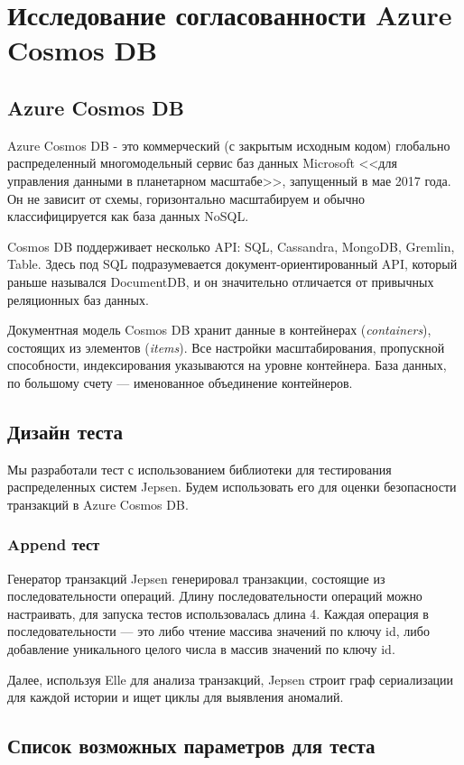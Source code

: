 \documentclass[12pt,  openany]{book}
\begin{document}
\chapter{Исследование согласованности Azure Cosmos DB}
\section{Azure Cosmos DB}
Azure Cosmos DB - это коммерческий (с закрытым исходным кодом) глобально распределенный многомодельный сервис баз данных Microsoft <<для управления данными в планетарном масштабе>>, запущенный в мае 2017 года. Он не зависит от схемы, горизонтально масштабируем и обычно классифицируется как база данных NoSQL.
\par Cosmos DB поддерживает несколько API: SQL, Cassandra, MongoDB, Gremlin, Table. Здесь под SQL подразумевается документ-ориентированный API, который раньше назывался DocumentDB, и он значительно отличается от привычных реляционных баз данных.
\par Документная модель Cosmos DB хранит данные в контейнерах (\textit{containers}), состоящих из элементов (\textit{items}). Все настройки масштабирования, пропускной способности, индексирования указываются на уровне контейнера. База данных, по большому счету --- именованное объединение контейнеров.

\section{Дизайн теста}
Мы разработали тест с использованием библиотеки для тестирования распределенных систем Jepsen. Будем использовать его для оценки безопасности транзакций в Azure Cosmos DB. 
\subsection{Append тест}
Генератор транзакций Jepsen генерировал транзакции, состоящие из последовательности операций. Длину последовательности операций можно настраивать, для запуска тестов использовалась длина 4. Каждая операция в последовательности --- это либо чтение массива значений по ключу id, либо добавление уникального целого числа в массив значений по ключу id. 
\par
Далее, используя Elle для анализа транзакций, Jepsen строит граф сериализации для каждой истории и ищет циклы для выявления аномалий. 

\section{Список возможных параметров для теста}
\end{document}
